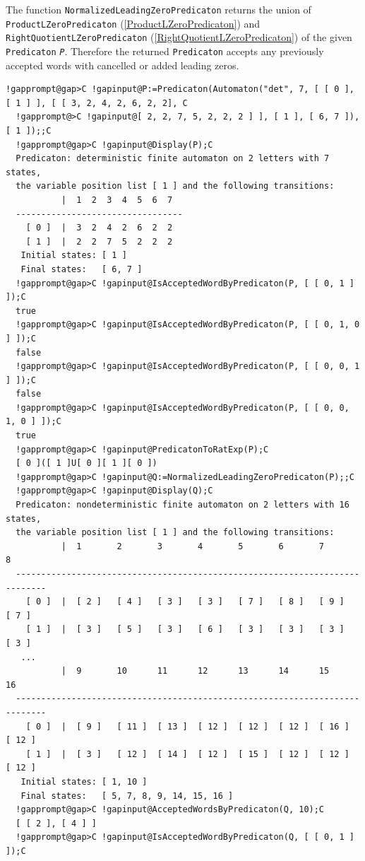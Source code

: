 \documentclass[a4paper,11pt]{report}
\begin{document}
{{{ The function \texttt{NormalizedLeadingZeroPredicaton} returns the union of \texttt{ProductLZeroPredicaton} (\ref{ProductLZeroPredicaton}) and \texttt{RightQuotientLZeroPredicaton} (\ref{RightQuotientLZeroPredicaton}) of the given \texttt{Predicaton} \mbox{\texttt{\mdseries\slshape P}}. Therefore the returned \texttt{Predicaton} accepts any previously accepted words with cancelled or added leading zeros. 
\begin{Verbatim}[commandchars=!@C,fontsize=\small,frame=single,label=Example]
  !gapprompt@gap>C !gapinput@P:=Predicaton(Automaton("det", 7, [ [ 0 ], [ 1 ] ], [ [ 3, 2, 4, 2, 6, 2, 2], C
  !gapprompt@>C !gapinput@[ 2, 2, 7, 5, 2, 2, 2 ] ], [ 1 ], [ 6, 7 ]), [ 1 ]);;C
  !gapprompt@gap>C !gapinput@Display(P);C
  Predicaton: deterministic finite automaton on 2 letters with 7 states, 
  the variable position list [ 1 ] and the following transitions:
           |  1  2  3  4  5  6  7  
  ---------------------------------
    [ 0 ]  |  3  2  4  2  6  2  2  
    [ 1 ]  |  2  2  7  5  2  2  2  
   Initial states: [ 1 ]
   Final states:   [ 6, 7 ]
  !gapprompt@gap>C !gapinput@IsAcceptedWordByPredicaton(P, [ [ 0, 1 ] ]);C
  true
  !gapprompt@gap>C !gapinput@IsAcceptedWordByPredicaton(P, [ [ 0, 1, 0 ] ]);C
  false
  !gapprompt@gap>C !gapinput@IsAcceptedWordByPredicaton(P, [ [ 0, 0, 1 ] ]);C
  false
  !gapprompt@gap>C !gapinput@IsAcceptedWordByPredicaton(P, [ [ 0, 0, 1, 0 ] ]);C
  true
  !gapprompt@gap>C !gapinput@PredicatonToRatExp(P);C
  [ 0 ]([ 1 ]U[ 0 ][ 1 ][ 0 ])
  !gapprompt@gap>C !gapinput@Q:=NormalizedLeadingZeroPredicaton(P);;C
  !gapprompt@gap>C !gapinput@Display(Q);C
  Predicaton: nondeterministic finite automaton on 2 letters with 16 states,
  the variable position list [ 1 ] and the following transitions:
           |  1       2       3       4       5       6       7       8       
  ----------------------------------------------------------------------------
    [ 0 ]  |  [ 2 ]   [ 4 ]   [ 3 ]   [ 3 ]   [ 7 ]   [ 8 ]   [ 9 ]   [ 7 ]   
    [ 1 ]  |  [ 3 ]   [ 5 ]   [ 3 ]   [ 6 ]   [ 3 ]   [ 3 ]   [ 3 ]   [ 3 ]   
   ...
           |  9       10      11      12      13      14      15      16      
  ----------------------------------------------------------------------------
    [ 0 ]  |  [ 9 ]   [ 11 ]  [ 13 ]  [ 12 ]  [ 12 ]  [ 12 ]  [ 16 ]  [ 12 ]  
    [ 1 ]  |  [ 3 ]   [ 12 ]  [ 14 ]  [ 12 ]  [ 15 ]  [ 12 ]  [ 12 ]  [ 12 ]  
   Initial states: [ 1, 10 ]
   Final states:   [ 5, 7, 8, 9, 14, 15, 16 ]
  !gapprompt@gap>C !gapinput@AcceptedWordsByPredicaton(Q, 10);C
  [ [ 2 ], [ 4 ] ]
  !gapprompt@gap>C !gapinput@IsAcceptedWordByPredicaton(Q, [ [ 0, 1 ] ]);C

\end{Verbatim}}}}
\end{document}
